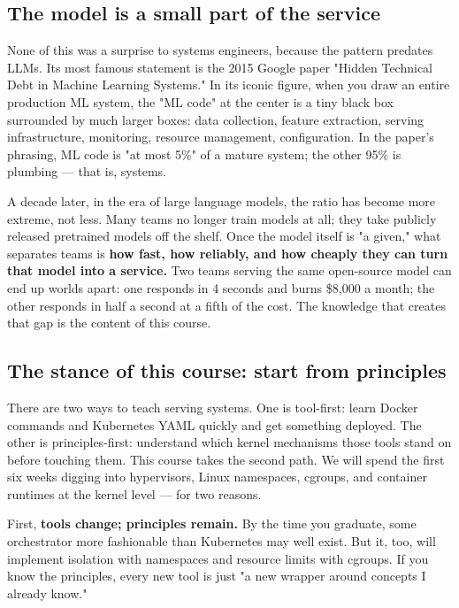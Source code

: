 \subsection*{The model is a small part of the service}

None of this was a surprise to systems engineers, because the pattern predates LLMs. Its most famous statement is the 2015 Google paper "Hidden Technical Debt in Machine Learning Systems." In its iconic figure, when you draw an entire production ML system, the "ML code" at the center is a tiny black box surrounded by much larger boxes: data collection, feature extraction, serving infrastructure, monitoring, resource management, configuration. In the paper's phrasing, ML code is "at most 5\%" of a mature system; the other 95\% is plumbing — that is, systems.

A decade later, in the era of large language models, the ratio has become more extreme, not less. Many teams no longer train models at all; they take publicly released pretrained models off the shelf. Once the model itself is "a given," what separates teams is \textbf{how fast, how reliably, and how cheaply they can turn that model into a service.} Two teams serving the same open-source model can end up worlds apart: one responds in 4 seconds and burns \$8,000 a month; the other responds in half a second at a fifth of the cost. The knowledge that creates that gap is the content of this course.

\subsection*{The stance of this course: start from principles}

There are two ways to teach serving systems. One is tool-first: learn Docker commands and Kubernetes YAML quickly and get something deployed. The other is principles-first: understand which kernel mechanisms those tools stand on before touching them. This course takes the second path. We will spend the first six weeks digging into hypervisors, Linux namespaces, cgroups, and container runtimes at the kernel level — for two reasons.

First, \textbf{tools change; principles remain.} By the time you graduate, some orchestrator more fashionable than Kubernetes may well exist. But it, too, will implement isolation with namespaces and resource limits with cgroups. If you know the principles, every new tool is just "a new wrapper around concepts I already know."

